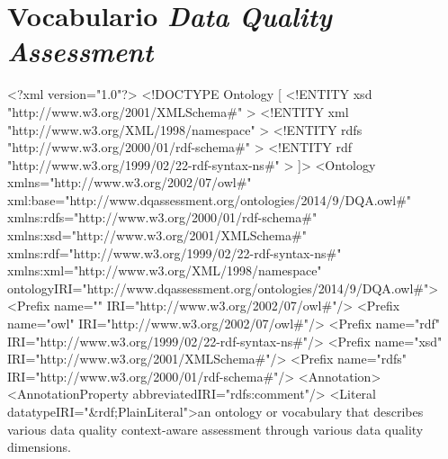 \chapter{Vocabulario \textit{Data Quality Assessment}}
\label{chap:ontologia}

\begin{listing}[
  language = XML,
  numbers=left,
  numberstyle=\tiny,
  stepnumber=5,
  numbersep=5pt,
  frame=single,
  caption  = {Vocabulario utilizado para los resultados finales},
  label    = code:onto-vocabulary]
<?xml version="1.0"?>
<!DOCTYPE Ontology [
    <!ENTITY xsd "http://www.w3.org/2001/XMLSchema#" >
    <!ENTITY xml "http://www.w3.org/XML/1998/namespace" >
    <!ENTITY rdfs "http://www.w3.org/2000/01/rdf-schema#" >
    <!ENTITY rdf "http://www.w3.org/1999/02/22-rdf-syntax-ns#" >
]>
<Ontology xmlns="http://www.w3.org/2002/07/owl#"
     xml:base="http://www.dqassessment.org/ontologies/2014/9/DQA.owl#"
     xmlns:rdfs="http://www.w3.org/2000/01/rdf-schema#"
     xmlns:xsd="http://www.w3.org/2001/XMLSchema#"
     xmlns:rdf="http://www.w3.org/1999/02/22-rdf-syntax-ns#"
     xmlns:xml="http://www.w3.org/XML/1998/namespace"
     ontologyIRI="http://www.dqassessment.org/ontologies/2014/9/DQA.owl#">
    <Prefix name="" IRI="http://www.w3.org/2002/07/owl#"/>
    <Prefix name="owl" IRI="http://www.w3.org/2002/07/owl#"/>
    <Prefix name="rdf" IRI="http://www.w3.org/1999/02/22-rdf-syntax-ns#"/>
    <Prefix name="xsd" IRI="http://www.w3.org/2001/XMLSchema#"/>
    <Prefix name="rdfs" IRI="http://www.w3.org/2000/01/rdf-schema#"/>
    <Annotation>
        <AnnotationProperty abbreviatedIRI="rdfs:comment"/>
        <Literal datatypeIRI="&rdf;PlainLiteral">an ontology or vocabulary that describes various data quality context-aware assessment through various data quality dimensions. 


\end{listing}
